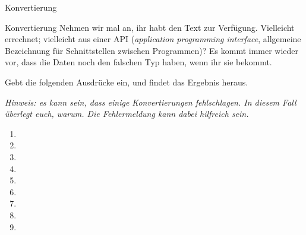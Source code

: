 \begin{task}[points=auto]{Konvertierung }
    \begin{subtask*}[points=0]{Konvertierung}
        Nehmen wir mal an, ihr habt den Text  zur Verfügung. Vielleicht
        errechnet; vielleicht aus einer API (\textit{application programming interface}, allgemeine Bezeichnung für Schnittstellen zwischen Programmen)? Es kommt immer wieder vor, dass die Daten noch den falschen Typ haben, wenn ihr sie bekommt.

        Gebt die folgenden Ausdrücke ein, und findet das Ergebnis heraus.

        \textit{Hinweis: es kann sein, dass einige Konvertierungen fehlschlagen. In diesem Fall überlegt euch, warum. Die Fehlermeldung kann dabei hilfreich sein.}

        \begin{multicols}{3}
            \begin{enumerate}
                \item {}
                \item {}
                \item {}
                \item {}
                \item {}
                \item {}
                \item {}
                \item {}
                \item {}
            \end{enumerate}
        \end{multicols}


\end{subtask*}
\end{task}
